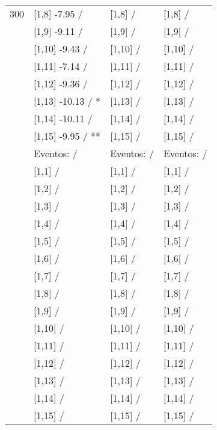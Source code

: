 \begin{table}
\begin{tabular}[t]{llll}
300 & {}[1,8] -7.95  / & {}[1,8]  / & {}[1,8]  /\\
\addlinespace
 & {}[1,9] -9.11  / & {}[1,9]  / & {}[1,9]  /\\
 & {}[1,10] -9.43  / & {}[1,10]  / & {}[1,10]  /\\
 & {}[1,11] -7.14  / & {}[1,11]  / & {}[1,11]  /\\
 & {}[1,12] -9.36  / & {}[1,12]  / & {}[1,12]  /\\
 & {}[1,13] -10.13  / * & {}[1,13]  / & {}[1,13]  /\\
\addlinespace
 & {}[1,14] -10.11  / & {}[1,14]  / & {}[1,14]  /\\
 & {}[1,15] -9.95  / ** & {}[1,15]  / & {}[1,15]  /\\
 & Eventos:   / & Eventos:   / & Eventos:   /\\
 & {}[1,1]  / & {}[1,1]  / & {}[1,1]  /\\
 & {}[1,2]  / & {}[1,2]  / & {}[1,2]  /\\
\addlinespace
 & {}[1,3]  / & {}[1,3]  / & {}[1,3]  /\\
 & {}[1,4]  / & {}[1,4]  / & {}[1,4]  /\\
 & {}[1,5]  / & {}[1,5]  / & {}[1,5]  /\\
 & {}[1,6]  / & {}[1,6]  / & {}[1,6]  /\\
 & {}[1,7]  / & {}[1,7]  / & {}[1,7]  /\\
\addlinespace
500 & {}[1,8]  / & {}[1,8]  / & {}[1,8]  /\\
 & {}[1,9]  / & {}[1,9]  / & {}[1,9]  /\\
 & {}[1,10]  / & {}[1,10]  / & {}[1,10]  /\\
 & {}[1,11]  / & {}[1,11]  / & {}[1,11]  /\\
 & {}[1,12]  / & {}[1,12]  / & {}[1,12]  /\\
\addlinespace
 & {}[1,13]  / & {}[1,13]  / & {}[1,13]  /\\
 & {}[1,14]  / & {}[1,14]  / & {}[1,14]  /\\
 & {}[1,15]  / & {}[1,15]  / & {}[1,15]  /\\
\bottomrule
\end{tabular}
\end{table}
